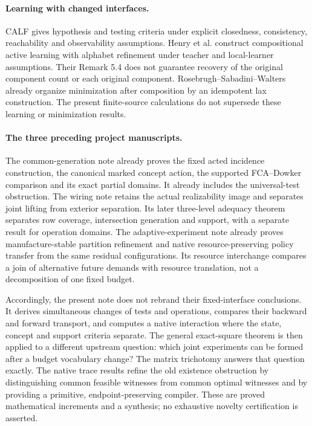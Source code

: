 \documentclass[11pt]{article}
\theoremstyle{definition}\newtheorem{definition}[theorem]{Definition}
\theoremstyle{remark}\newtheorem{remark}[theorem]{Remark}
\begin{document}
\paragraph{Learning with changed interfaces.}
CALF \cite[Theorems 16 and 20]{CALF} gives hypothesis and testing
criteria under explicit closedness, consistency, reachability and
observability assumptions. Henry et al. \cite[Theorem 5.3]{CoalA}
construct compositional active learning with alphabet refinement under
teacher and local-learner assumptions. Their Remark 5.4 does not guarantee
recovery of the original component count or each original component.
Rosebrugh--Sabadini--Walters \cite[Propositions 43 and 46,
Corollary 47]{MinimalRealization} already organize minimization after
composition by an idempotent lax construction. The present finite-source
calculations do not supersede these learning or minimization results.

\paragraph{The three preceding project manuscripts.}
The common-generation note \cite{Common} already proves the fixed acted
incidence construction, the canonical marked concept action, the supported
FCA--Dowker comparison and its exact partial domains. It already includes
the universal-test obstruction. The wiring note \cite{Wiring} retains
the actual realizability image and separates joint lifting from exterior
separation. Its later three-level adequacy theorem separates row coverage,
intersection generation and support, with a separate result for operation
domains. The adaptive-experiment note \cite{Adaptive} already proves
manufacture-stable partition refinement and native resource-preserving
policy transfer from the same residual configurations. Its resource
interchange compares a join of alternative future demands with resource
translation, not a decomposition of one fixed budget.

Accordingly, the present note does not rebrand their fixed-interface
conclusions. It derives simultaneous changes of tests and operations,
compares their backward and forward transport, and computes a native
interaction where the state, concept and support criteria separate.
The general exact-square theorem is then applied to a different upstream
question: which joint experiments can be formed after a budget vocabulary
change? The matrix trichotomy answers that question exactly. The native
trace results refine the old existence obstruction by distinguishing
common feasible witnesses from common optimal witnesses and by providing
a primitive, endpoint-preserving compiler. These are proved mathematical
increments and a synthesis; no exhaustive novelty certification is asserted.
\end{document}
